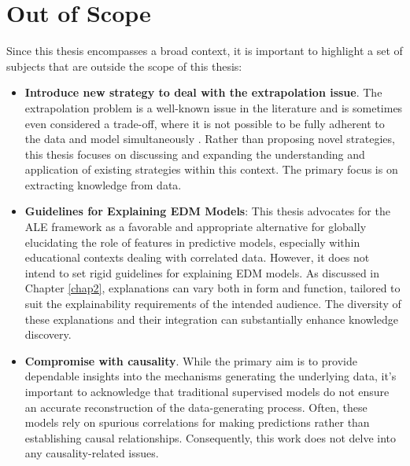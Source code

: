 \section{Out of Scope}
\label{fora_escopo}

Since this thesis encompasses a broad context, it is important to highlight a set of subjects that are outside the scope of this thesis:

\begin{itemize}
    \item \textbf{Introduce new strategy to deal with the extrapolation issue}. The extrapolation problem is a well-known issue in the literature and is sometimes even considered a trade-off, where it is not possible to be fully adherent to the data and model simultaneously \cite{Lundberg2020FromTrees., Chen2020TrueData}. Rather than proposing novel strategies, this thesis focuses on discussing and expanding the understanding and application of existing strategies within this context. The primary focus is on extracting knowledge from data.

    \item \textbf{Guidelines for Explaining \gls{EDM} Models}: This thesis advocates for the \gls{ALE} framework as a favorable and appropriate alternative for globally elucidating the role of features in predictive models, especially within educational contexts dealing with correlated data. However, it does not intend to set rigid guidelines for explaining \gls{EDM} models. As discussed in Chapter \ref{chap2}, explanations can vary both in form and function, tailored to suit the explainability requirements of the intended audience. The diversity of these explanations and their integration can substantially enhance knowledge discovery.

    \item \textbf{Compromise with causality}.  While the primary aim is to provide dependable insights into the mechanisms generating the underlying data, it's important to acknowledge that traditional supervised models do not ensure an accurate reconstruction of the data-generating process. Often, these models rely on spurious correlations for making predictions rather than establishing causal relationships. Consequently, this work does not delve into any causality-related issues.
    
\end{itemize}
